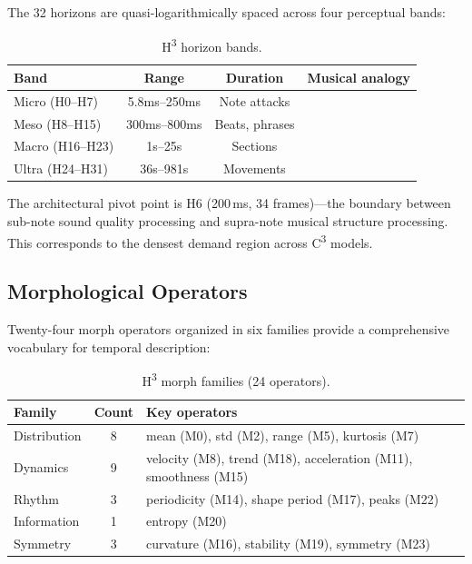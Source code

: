 \documentclass[10pt,twocolumn]{article}
\newcommand{\Hcube}{H\textsuperscript{3}}
\newcommand{\Ccube}{C\textsuperscript{3}}
\begin{document}
The 32 horizons are quasi-logarithmically spaced across four perceptual bands:

\begin{table}[!t]
\centering
\caption{\Hcube{} horizon bands.}
\label{tab:h3horizons}
\small
\begin{tabular}{@{}lccl@{}}
\toprule
\textbf{Band} & \textbf{Range} & \textbf{Duration} & \textbf{Musical analogy} \\
\midrule
Micro (H0--H7)   & 5.8ms--250ms  & Note attacks \\
Meso (H8--H15)   & 300ms--800ms  & Beats, phrases \\
Macro (H16--H23)  & 1s--25s       & Sections \\
Ultra (H24--H31)  & 36s--981s     & Movements \\
\bottomrule
\end{tabular}
\end{table}

The architectural pivot point is H6 (200\,ms, 34 frames)---the boundary between sub-note sound quality processing and supra-note musical structure processing.
This corresponds to the densest demand region across \Ccube{} models.

\subsection{Morphological Operators}

Twenty-four morph operators organized in six families provide a comprehensive vocabulary for temporal description:

\begin{table}[!t]
\centering
\caption{H\textsuperscript{3} morph families (24 operators).}
\label{tab:morphs}
\small
\begin{tabular}{@{}lcp{4.0cm}@{}}
\toprule
\textbf{Family} & \textbf{Count} & \textbf{Key operators} \\
\midrule
Distribution & 8 & mean (M0), std (M2), range (M5), kurtosis (M7) \\
Dynamics     & 9 & velocity (M8), trend (M18), acceleration (M11), smoothness (M15) \\
Rhythm       & 3 & periodicity (M14), shape period (M17), peaks (M22) \\
Information  & 1 & entropy (M20) \\
Symmetry     & 3 & curvature (M16), stability (M19), symmetry (M23) \\
\bottomrule
\end{tabular}
\end{table}
\end{document}
